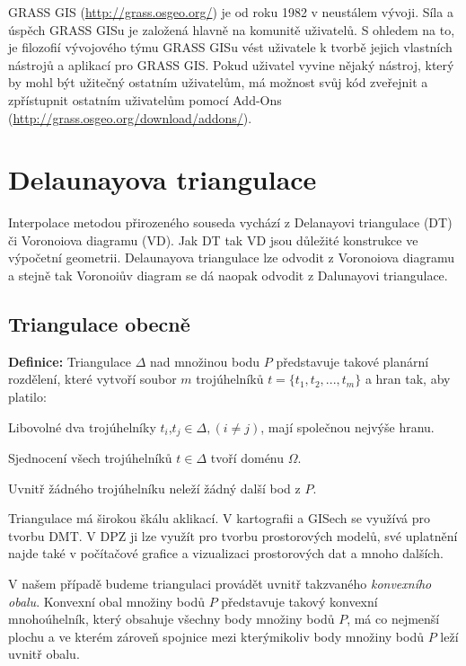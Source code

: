 \documentclass[12pt,a4paper]{article}
\begin{document}
GRASS GIS (\url{http://grass.osgeo.org/}) je od roku 1982 v neustálem vývoji. Síla a úspěch GRASS GISu
je založená hlavně na komunitě uživatelů. S ohledem na to, je
filozofií vývojového týmu GRASS GISu vést uživatele k tvorbě jejich
vlastních nástrojů a aplikací pro GRASS GIS. Pokud uživatel vyvine
nějaký nástroj, který by mohl být užitečný ostatním uživatelům, má
možnost svůj kód zveřejnit a zpřístupnit ostatním uživatelům pomocí
Add-Ons (\url{http://grass.osgeo.org/download/addons/}).

\newpage
\section{Delaunayova triangulace}

Interpolace metodou přirozeného souseda vychází z Delanayovi
triangulace (DT) či Voronoiova diagramu (VD). Jak DT tak VD jsou důležité
konstrukce ve výpočetní geometrii. Delaunayova triangulace lze odvodit
z Voronoiova diagramu a stejně tak Voronoiův diagram se dá naopak
odvodit z Dalunayovi triangulace.

\subsection{Triangulace obecně}
\textbf{Definice\cite{TB1}:} Triangulace $\Delta$ nad množinou bodu
$P$ představuje takové planární rozdělení, které vytvoří soubor $m$
trojúhelníků $t = \{ t_1, t_2,...,t_m \}$ a hran tak, aby platilo:

Libovolné dva trojúhelníky $t_i$,$t_j \in \Delta, (i \neq j)$, mají
společnou nejvýše hranu.

Sjednocení všech trojúhelníků $t \in \Delta$ tvoří doménu $\Omega$.

Uvnitř žádného trojúhelníku neleží žádný další bod z $P$.

\bigskip

Triangulace má širokou škálu aklikací. V kartografii a GISech se
využívá pro tvorbu DMT. V DPZ ji lze využít pro tvorbu prostorových
modelů, své uplatnění najde také v počítačové grafice a vizualizaci
prostorových dat a mnoho dalších.

V našem případě budeme triangulaci provádět uvnitř takzvaného
\emph{konvexního obalu}. Konvexní obal množiny bodů $P$ představuje
takový konvexní mnohoúhelník, který obsahuje všechny body množiny bodů
$P$, má co nejmenší plochu a ve kterém zároveň spojnice mezi
kterýmikoliv body množiny bodů $P$ leží uvnitř obalu.
\end{document}
